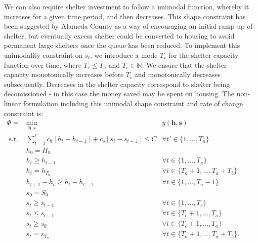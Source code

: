 \documentclass[12pt,a4paper]{article}
\begin{document}
We can also require shelter investment to follow a unimodal function, whereby it increases for a given time period, and then decreases.  This shape constraint has been suggested by Alameda County as a way of encouraging an initial ramp-up of shelter, but eventually excess shelter could be converted to housing to avoid permanent large shelters once the queue has been reduced.  To implement this unimodality constraint on $s_t$, we introduce a mode $T_c$ for the shelter capacity function over time, where $T_c \leq T_a$ and $T_c \in \mathbb{N}$. We ensure that the shelter capacity monotonically increases before $T_c$ and monotonically decreases subsequently. Decreases in the shelter capacity correspond to shelter being decomissioned - in this case the money saved may be spent on housing. The non-linear formulation including this unimodal shape constraint and rate of change constraint is:
%
\begin{eqnarray}
        \Phi = & \min_{\boldsymbol{h},\boldsymbol{s}} & y(\boldsymbol{h},\boldsymbol{s})\label{p2c0} \\
        \text{ s.t. } & \sum_{t=1}^{t'} c_{h}[h_{t}-h_{t-1}] + c_{s}[s_t-s_{t-1}] \leq C & \forall t' \in \{1, ..., T_a\}\,\quad \quad\label{p2c1}\\
        & h_0 = H_0 & \label{p2c2} \\
        & h_{t} \geq h_{t-1} & \forall t \in \{1,...,T_a\}\, \quad \quad\label{p2c3}\\   
        & h_t = h_{T_a} & \forall t \in \{T_a+1,...,T_a+T_b\}\, \quad \quad \label{p2c4} \\
        & h_{t+1} - h_{t} \geq h_{t} - h_{t-1} & \forall t \in \{1,...,T_a-1\}\, \quad \quad\label{p2c5} \\    
        & s_0 = S_0 & \label{p2c6} \\
        & s_{t} \geq s_{t-1} & \forall t \in \{1,...,T_c\}\, \quad \quad\label{p2c7} \\
        & s_{t} \leq s_{t-1} & \forall t \in \{T_c+1,...,T_a\}\, \quad \quad\label{p2c8} \\ 
        & s_t \geq s_0 & \forall t \in \{T_c+1, ..., T_a\}\, \quad \quad \label{p2c9} \\
        & s_t = s_{T_a} & \forall t \in \{T_a+1,...,T_a+T_b\}. \quad \quad \label{p2c10}
\end{eqnarray}
%
\end{document}
